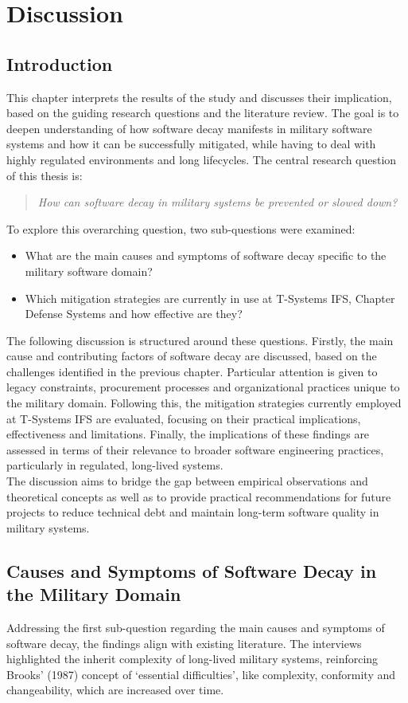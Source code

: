 \section{Discussion}
\subsection{Introduction}
This chapter interprets the results of the study and discusses their implication, based on the guiding research questions and the literature review. The goal is to deepen understanding of how software decay manifests in military software systems
and how it can be successfully mitigated, while having to deal with highly regulated environments and long lifecycles.
The central research question of this thesis is:
\begin{quote}
\textit{How can software decay in military systems be prevented or slowed down?}
\end{quote}
To explore this overarching question, two sub-questions were examined:
\begin{itemize}
    \item What are the main causes and symptoms of software decay specific to the military software domain?
    \item Which mitigation strategies are currently in use at T-Systems IFS, Chapter Defense Systems and how effective are they?
\end{itemize}
The following discussion is structured around these questions. Firstly, the main cause and contributing factors of software decay are discussed, based on the challenges identified in the previous chapter. Particular attention is given to legacy constraints, procurement processes and organizational practices unique to the military domain.
Following this, the mitigation strategies currently employed at T-Systems IFS are evaluated, focusing on their practical implications, effectiveness and limitations. Finally, the implications of these findings are assessed in terms of their relevance to broader software engineering practices, particularly in regulated, long-lived systems.\\
The discussion aims to bridge the gap between empirical observations and theoretical concepts as well as to provide practical recommendations for future projects to reduce technical debt and maintain long-term software quality in military systems.\\

\subsection{Causes and Symptoms of Software Decay in the Military Domain}
Addressing the first sub-question regarding the main causes and symptoms of software decay, the findings align with existing literature. The interviews highlighted the inherit complexity of long-lived military systems, reinforcing Brooks' (1987) concept of `essential difficulties', like complexity, conformity and changeability, which are increased over time.\\

